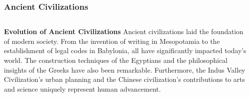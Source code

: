 \documentclass[5pt]{beamer}
\begin{document}
\begin{frame}
\frametitle{Ancient Civilizations}
\begin{columns}
\begin{column}{0.7\textwidth}
\begin{block}{\textbf{Evolution of Ancient Civilizations}}
Ancient civilizations laid the foundation of modern society. From the invention of writing in Mesopotamia to the establishment of legal codes in Babylonia, all have significantly impacted today's world. The construction techniques of the Egyptians and the philosophical insights of the Greeks have also been remarkable. Furthermore, the Indus Valley Civilization's urban planning and the Chinese civilization's contributions to arts and science uniquely represent human advancement.
\end{block}
\end{column}
\end{columns}
\end{frame}
\end{document}
